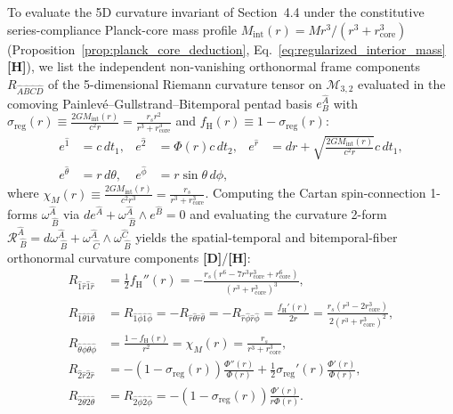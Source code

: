\documentclass[11pt,a4paper]{article}
\newcommand{\catD}{\textbf{\textcolor{blue!75!black}{[D]}}}
\newcommand{\catH}{\textbf{\textcolor{orange!85!black}{[H]}}}
\theoremstyle{plain}
\theoremstyle{definition}
\theoremstyle{remark}
\numberwithin{equation}{section}
\begin{document}
To evaluate the 5D curvature invariant of Section~4.4 under the constitutive series-compliance Planck-core mass profile $M_{\text{int}}(r) = M r^3 / (r^3 + r_{\text{core}}^3)$ (Proposition~\ref{prop:planck_core_deduction}, Eq.~\ref{eq:regularized_interior_mass} \catH), we list the independent non-vanishing orthonormal frame components $R_{\hat{A}\hat{B}\hat{C}\hat{D}}$ of the 5-dimensional Riemann curvature tensor on $\mathcal{M}_{3,2}$ evaluated in the comoving Painlev\'e--Gullstrand--Bitemporal pentad basis $e^{\hat{A}}_B$ with $\sigma_{\text{reg}}(r) \equiv \frac{2GM_{\text{int}}(r)}{c^2 r} = \frac{r_s r^2}{r^3 + r_{\text{core}}^3}$ and $f_{\text{H}}(r) \equiv 1 - \sigma_{\text{reg}}(r)$:
\begin{align}
e^{\hat{1}} &= c\,dt_1, & e^{\hat{2}} &= \Phi(r)c\,dt_2, & e^{\hat{r}} &= dr + \sqrt{\frac{2GM_{\text{int}}(r)}{c^2 r}}c\,dt_1, \nonumber \\[3pt]
e^{\hat{\theta}} &= r\,d\theta, & e^{\hat{\phi}} &= r\sin\theta\,d\phi, & &
\label{eq:pentad_basis_appendix}
\end{align}
where $\chi_M(r) \equiv \frac{2GM_{\text{int}}(r)}{c^2 r^3} = \frac{r_s}{r^3 + r_{\text{core}}^3}$. Computing the Cartan spin-connection 1-forms $\omega^{\hat{A}}_{\;\hat{B}}$ via $de^{\hat{A}} + \omega^{\hat{A}}_{\;\hat{B}} \wedge e^{\hat{B}} = 0$ and evaluating the curvature 2-form $\mathcal{R}^{\hat{A}}_{\;\hat{B}} = d\omega^{\hat{A}}_{\;\hat{B}} + \omega^{\hat{A}}_{\;\hat{C}} \wedge \omega^{\hat{C}}_{\;\hat{B}}$ yields the spatial-temporal and bitemporal-fiber orthonormal curvature components \catD/\catH:
\begin{align}
R_{\hat{1}\hat{r}\hat{1}\hat{r}} &= \frac{1}{2}f_{\text{H}}''(r) = -\frac{r_s\left(r^6 - 7 r^3 r_{\text{core}}^3 + r_{\text{core}}^6\right)}{\left(r^3 + r_{\text{core}}^3\right)^3}, \label{eq:riem_1r1r} \\[4pt]
R_{\hat{1}\hat{\theta}\hat{1}\hat{\theta}} &= R_{\hat{1}\hat{\phi}\hat{1}\hat{\phi}} = -R_{\hat{r}\hat{\theta}\hat{r}\hat{\theta}} = -R_{\hat{r}\hat{\phi}\hat{r}\hat{\phi}} = \frac{f_{\text{H}}'(r)}{2 r} = \frac{r_s\left(r^3 - 2r_{\text{core}}^3\right)}{2\left(r^3 + r_{\text{core}}^3\right)^2}, \label{eq:riem_1theta} \\[4pt]
R_{\hat{\theta}\hat{\phi}\hat{\theta}\hat{\phi}} &= \frac{1 - f_{\text{H}}(r)}{r^2} = \chi_M(r) = \frac{r_s}{r^3 + r_{\text{core}}^3}, \label{eq:riem_thetaphi} \\[4pt]
R_{\hat{2}\hat{r}\hat{2}\hat{r}} &= -\left(1 - \sigma_{\text{reg}}(r)\right)\frac{\Phi''(r)}{\Phi(r)} + \frac{1}{2}\sigma_{\text{reg}}'(r)\frac{\Phi'(r)}{\Phi(r)}, \label{eq:riem_2r2r} \\[4pt]
R_{\hat{2}\hat{\theta}\hat{2}\hat{\theta}} &= R_{\hat{2}\hat{\phi}\hat{2}\hat{\phi}} = -\left(1 - \sigma_{\text{reg}}(r)\right)\frac{\Phi'(r)}{r\Phi(r)}.
\label{eq:riem_2theta}
\end{align}
\end{document}
